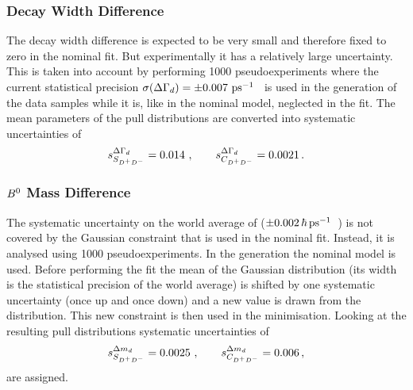 \subsubsection{Decay Width Difference \texorpdfstring{\DGd}{Delta Gamma\_d}}
\label{sec:b02dd:systematics:deltagammad}

The decay width difference \DGd is expected to be very small and therefore
fixed to zero in the nominal fit. But experimentally it has a relatively large
uncertainty. This is taken into account by performing \num{1000}
pseudoexperiments where the current statistical precision $\sigma(\DGd) =
\SI{\pm0.007}{\invps}$~\cite{HFAG} is used in the generation of the data
samples while it is, like in the nominal model, neglected in the fit. The mean
parameters of the pull distributions are converted into systematic
uncertainties of
\begin{align*}
s_{\SDD}^{\DGd} = \num{0.014}\ , \qquad s_{\CDD}^{\DGd} = \num{0.0021}\,.
\end{align*}

\subsubsection{\texorpdfstring{$\Bz$}{B0} Mass Difference \texorpdfstring{\dmd}{Delta m\_d}}
\label{sec:b02dd:systematics:deltamd}

The systematic uncertainty on the world average of \dmd
($\SI{\pm0.002}{\hbar\invps}$~\cite{HFAG}) is not covered by the Gaussian constraint that
is used in the nominal fit. Instead, it is analysed using \num{1000}
pseudoexperiments. In the generation the nominal model is used. Before
performing the fit the mean of the Gaussian distribution (its width is the
statistical precision of the world average) is shifted by one systematic
uncertainty (once up and once down) and a new value is drawn from the
distribution. This new constraint is then used in the minimisation. Looking at
the resulting pull distributions systematic uncertainties of
\begin{align*}
s_{\SDD}^{\dmd} = \num{0.0025}\ , \qquad s_{\CDD}^{\dmd} = \num{0.006}\,,
\end{align*}
are assigned.
